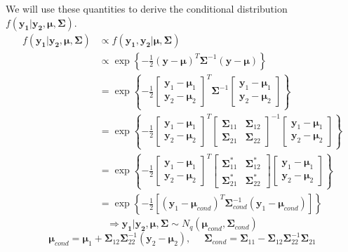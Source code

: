 \documentclass{article}
\begin{document}
We will use these quantities to derive the conditional distribution $f(\mathbf{y_1}|\mathbf{y_2},\boldsymbol\mu,\boldsymbol\Sigma)$. 
\begin{align*} 
f(\mathbf{y_1}|\mathbf{y_2},\boldsymbol\mu,\boldsymbol\Sigma) & \propto  f(\mathbf{y_1},\mathbf{y_2}|\boldsymbol\mu,\boldsymbol\Sigma) \\
& \propto \exp \left \{ -\frac{1}{2}(\mathbf{y} - \boldsymbol\mu)^T \boldsymbol\Sigma^{-1} (\mathbf{y} - \boldsymbol\mu) \right \} \\
& = \exp \left \{ -\frac{1}{2}\begin{bmatrix} \mathbf{y}_1 - \boldsymbol\mu_1 \\  \mathbf{y}_2 - \boldsymbol\mu_2 \end{bmatrix}^T \boldsymbol\Sigma^{-1} \begin{bmatrix} \mathbf{y}_1 - \boldsymbol\mu_1 \\  \mathbf{y}_2 - \boldsymbol\mu_2 \end{bmatrix} \right \} \\
& =  \exp \left \{ -\frac{1}{2}\begin{bmatrix} \mathbf{y}_1 - \boldsymbol\mu_1 \\  \mathbf{y}_2 - \boldsymbol\mu_2 \end{bmatrix}^T \begin{bmatrix} \boldsymbol\Sigma_{11} & \boldsymbol\Sigma_{12} \\ \boldsymbol\Sigma_{21} & \boldsymbol\Sigma_{22} \end{bmatrix}^{-1} \begin{bmatrix} \mathbf{y}_1 - \boldsymbol\mu_1 \\  \mathbf{y}_2 - \boldsymbol\mu_2 \end{bmatrix} \right \} \\
& = \exp \left \{ -\frac{1}{2}\begin{bmatrix} \mathbf{y}_1 - \boldsymbol\mu_1 \\  \mathbf{y}_2 - \boldsymbol\mu_2 \end{bmatrix}^T \begin{bmatrix} \boldsymbol\Sigma_{11}^* & \boldsymbol\Sigma_{12}^* \\ \boldsymbol\Sigma_{21}^* & \boldsymbol\Sigma_{22}^* \end{bmatrix} \begin{bmatrix} \mathbf{y}_1 - \boldsymbol\mu_1 \\  \mathbf{y}_2 - \boldsymbol\mu_2 \end{bmatrix} \right \} \\
& = \exp \left \{ -\frac{1}{2} \left[ (\mathbf{y}_1 - \boldsymbol\mu_{cond})^T \boldsymbol\Sigma_{cond}^{-1}(\mathbf{y}_1 - \boldsymbol\mu_{cond})\right]\right \} 
\end{align*}
$$\Rightarrow \mathbf{y_1}|\mathbf{y_2},\boldsymbol\mu,\boldsymbol\Sigma \sim N_q(\boldsymbol\mu_{cond},\boldsymbol\Sigma_{cond})$$
$$\boldsymbol\mu_{cond} = \boldsymbol\mu_1 + \boldsymbol\Sigma_{12}\boldsymbol\Sigma_{22}^{-1}(\mathbf{y}_2 - \boldsymbol\mu_2), \ \ \ \ \ \ \boldsymbol\Sigma_{cond} = \boldsymbol\Sigma_{11} - \boldsymbol\Sigma_{12}\boldsymbol\Sigma_{22}^{-1}\boldsymbol\Sigma_{21}$$
\end{document}
